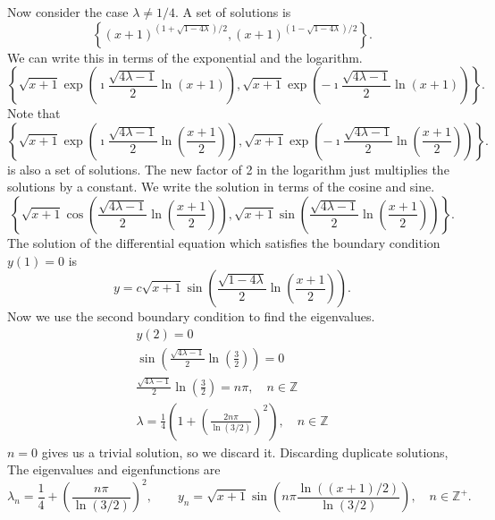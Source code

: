 {\begin{Solution}
  Now consider the case $\lambda \neq 1/4$.  A set of solutions is
  \[
  \left\{
    (x+1)^{(1 + \sqrt{1 - 4 \lambda})/2},
    (x+1)^{(1 - \sqrt{1 - 4 \lambda})/2}
  \right\}.
  \]
  We can write this in terms of the exponential and the logarithm.
  \[
  \left\{
    \sqrt{x+1} \exp \left( \imath \frac{ \sqrt{4 \lambda - 1} }{ 2 } \ln(x+1) \right),
    \sqrt{x+1} \exp \left( -\imath \frac{ \sqrt{4 \lambda - 1} }{ 2 } \ln(x+1) \right)
  \right\}.
  \]
  Note that 
  \[
  \left\{
    \sqrt{x+1} \exp \left( \imath \frac{ \sqrt{4 \lambda - 1} }{ 2 } 
      \ln \left( \frac{x+1}{2} \right) \right),
    \sqrt{x+1} \exp \left( -\imath \frac{ \sqrt{4 \lambda - 1} }{ 2 } 
      \ln \left( \frac{x+1}{2} \right) \right)
  \right\}.
  \]
  is also a set of solutions. The new factor of 2 in the logarithm just 
  multiplies the solutions by a constant.  
  We write the solution in terms of the cosine and sine.
  \[
  \left\{
    \sqrt{x+1} \cos \left( \frac{ \sqrt{4 \lambda - 1} }{ 2 } 
      \ln \left( \frac{x+1}{2} \right) \right),
    \sqrt{x+1} \sin \left( \frac{ \sqrt{4 \lambda - 1} }{ 2 } 
      \ln \left( \frac{x+1}{2} \right) \right)
  \right\}.
  \]
  The solution of the differential equation which satisfies 
  the boundary condition $y(1) = 0$ is
  \[
  y = c \sqrt{x+1} \sin \left( \frac{ \sqrt{1 - 4 \lambda} }{ 2 } 
    \ln \left( \frac{x+1}{2} \right) \right).
  \]
  Now we use the second boundary condition to find the eigenvalues.
  \begin{gather*}
    y(2) = 0 \\
    \sin \left( \frac{ \sqrt{4 \lambda - 1} }{ 2 } 
      \ln \left( \frac{3}{2} \right) \right) = 0 \\
    \frac{ \sqrt{4 \lambda - 1} }{ 2 } 
    \ln \left( \frac{3}{2} \right) = n \pi, \quad n \in \mathbb{Z} \\
    \lambda = \frac{1}{4} \left( 1 
      + \left( \frac{2 n \pi}{\ln(3/2)} \right)^2 \right),
    \quad n \in \mathbb{Z}
  \end{gather*}
  $n = 0$ gives us a trivial solution, so we discard it.  Discarding
  duplicate solutions, The eigenvalues and eigenfunctions are
  \[
  \boxed{
    \lambda_n = \frac{1}{4}
    + \left( \frac{n \pi}{\ln(3/2)} \right)^2,
    \qquad
    y_n = \sqrt{x+1} \sin \left( n \pi \frac{ \ln((x+1)/2) }{ \ln(3/2) } \right),
    \quad n \in \mathbb{Z}^+.
    }
  \]





\end{Solution}}
